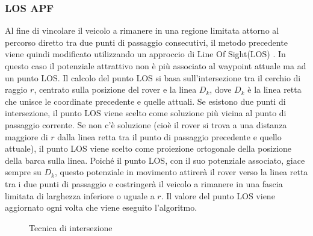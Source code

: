 \subsubsection{LOS APF}
 Al fine di vincolare il veicolo a rimanere in una regione limitata attorno al percorso diretto tra due punti di passaggio consecutivi, il metodo precedente viene quindi modificato utilizzando un approccio di Line Of Sight(LOS) \cite{LOSAPF}. In questo caso il potenziale attrattivo non è più associato al waypoint attuale ma ad un punto LOS.
Il calcolo del punto LOS si basa sull'intersezione tra il cerchio di raggio $r$, centrato sulla posizione del rover e la linea $D_k$, dove $D_k$ è la linea retta che unisce le coordinate precedente e quelle attuali. Se esistono due punti di intersezione, il punto LOS viene scelto come soluzione più vicina al punto di passaggio corrente. Se non c'è soluzione (cioè il rover si trova a una distanza maggiore di $r$ dalla linea retta tra il punto di passaggio precedente e quello attuale), il punto LOS viene scelto come proiezione ortogonale della posizione della barca sulla linea.
Poiché il punto LOS, con il suo potenziale associato, giace sempre su $D_k$, questo potenziale in movimento attirerà il rover verso la linea retta tra i due punti di passaggio e costringerà il veicolo a rimanere in una fascia limitata di larghezza inferiore o uguale a $r$. 
Il valore del punto LOS viene aggiornato ogni volta che viene eseguito l'algoritmo.
\begin{figure} [H]
    \centering
    
    \caption{Tecnica di intersezione}
    \label{fig:LOS}
\end{figure}

